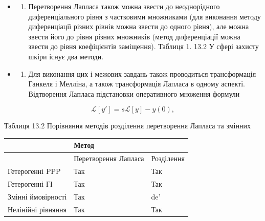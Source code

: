 \documentclass[
  ukrainian,
]{article}
\newcounter{none} %
\providecommand{\tightlist}{%
  \setlength{\itemsep}{0pt}\setlength{\parskip}{0pt}}
\begin{document}
\begin{itemize}
\tightlist
\item
  \begin{enumerate}
  \def\labelenumi{\arabic{enumi}.}
  \tightlist
  \item
    Перетворення Лапласа також можна звести до неоднорідного
    диференціального рівня з частковими множниками (для виконання методу
    диференціації різних рівнів можна звести до одного рівня), але можна
    звести його до рівня різних множників (метод диференціації можна
    звести до рівня коефіцієнтів заміщення). Таблиця 1. 13.2 У сфері
    захисту шкіри існує два методи.
  \end{enumerate}
\item
  \begin{enumerate}
  \def\labelenumi{\arabic{enumi}.}
  \setcounter{enumi}{1}
  \tightlist
  \item
    Для виконання цих і межових завдань також проводиться трансформація
    Ганкеля і Мелліна, а також трансформація Лапласа в одному аспекті.
    Відтворення Лапласа підстановки оперативного множення формули
  \end{enumerate}
\end{itemize}

\[
\mathscr{L}[y'] = s\mathscr{L}[y] - y(0),
\]

Таблиця 13.2 Порівняння методів розділення перетворення Лапласа та
змінних

{\def\LTcaptype{none} %
\begin{longtable}[]{@{}
  >{\raggedright\arraybackslash}p{}
  >{\raggedright\arraybackslash}p{}
  >{\raggedright\arraybackslash}p{}@{}}
\toprule\noalign{}
\begin{minipage}[b]{\linewidth}\raggedright
\end{minipage} & \begin{minipage}[b]{\linewidth}\raggedright
Метод
\end{minipage} & \begin{minipage}[b]{\linewidth}\raggedright
\end{minipage} \\
\midrule\noalign{}
\endhead
\bottomrule\noalign{}
\endlastfoot
& Перетворення Лапласа & Розділення \\
Гетерогенні PPP & Так & Так \\
Гетерогенні ГІ & Так & Так \\
Змінні ймовірності & Так & de' \\
Нелінійні рівняння & Так & Так \\
\end{longtable}
}
\end{document}
